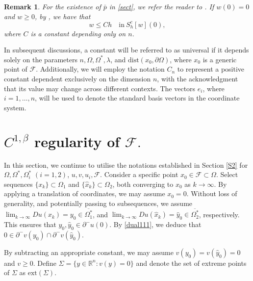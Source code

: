\documentclass[11pt]{amsart}
\theoremstyle{plain}
\newtheorem{remark}{Remark}[section]
\newcommand{\0}{\textbf{0}}
\numberwithin{equation}{section}
\numberwithin{equation}{section}
\numberwithin{figure}{section}
\begin{document}
\begin{remark}
\emph{For the existence of $\bar{p}$ in \eqref{sect}, we refer the reader to \cite{C92b}.
If $w(0)=0$ and $w\geq 0$, by \cite[Remark 2.5]{CLW3}, we have that 
\begin{equation}\label{secrela}
w \leq Ch \quad \text{in}\ S^c_h[w](0),
\end{equation}
where $C$ is a constant depending only on $n$. }
\end{remark}


In subsequent discussions, a constant will be referred to as universal if it depends solely on the parameters $n, \Omega, \Omega^*, \lambda$, and $\text{dist}(x_0, \partial\Omega)$, where $x_0$ is a generic point of $\mathcal{F}$. Additionally, we will employ the notation $C_n$ to represent a positive constant dependent exclusively on the dimension $n$, with the acknowledgment that its value may change across different contexts. The vectors \( e_i \), where \( i = 1, \ldots, n \), will be used to denote the standard basis vectors in the coordinate system.







\section{$C^{1,\beta}$ regularity of $\mathcal{F}.$}\label{S3}

In this section, we continue to utilise the notations established in Section \ref{S2} for $\Omega, \Omega^*, \Omega^*_i$ $(i=1,2)$, $u, v, u_i, \mathcal{F}$. Consider a specific point $x_0\in\mathcal{F} \subset \Omega$. Select sequences $\{x_k\} \subset \Omega_1$ and $\{\hat{x}_k\} \subset \Omega_2$, both converging to $x_0$ as $k \to \infty$. By applying a translation of coordinates, we may assume $x_0 = 0$.
Without loss of generality, and potentially passing to subsequences, we assume $\lim_{k\to\infty}Du(x_k)=y_0 \in \overline{\Omega^*_1}$, and $\lim_{k\to\infty}Du(\hat{x}_k)=\hat{y}_0 \in \overline{\Omega^*_2}$, respectively. This ensures that $y_0, \hat{y}_0 \in \partial^{-}u(0).$ By \eqref{dual111}, we deduce that $0\in\partial^{-}v(y_0) \cap \partial^{-}v(\hat{y}_0)$.

By subtracting an appropriate constant, we may assume $v(y_0)=v(\hat{y}_0)=0$ and $v\geq0$. Define $\Sigma = \{y\in\mathbb{R}^n : v(y) = 0\}$ and denote the set of extreme points of \( \Sigma \) as \( \text{ext}(\Sigma) \).  
\end{document}
